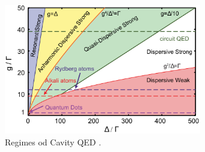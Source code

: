 \begin{figure}[htb]
    \centering
        \includegraphics[width=8.6cm]{chapters/Cavity_QED/figures/regimes_of_cavity_QED.pdf}
        \caption{Regimes od Cavity QED \cite{phd_thesis_schuster}.}
        \label{fig:schaukel}
\end{figure}




